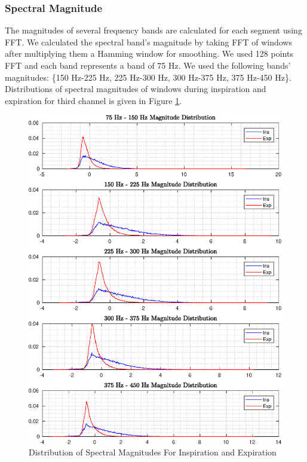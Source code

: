 \subsubsection{Spectral Magnitude}
The magnitudes of several frequency bands are calculated for each segment using FFT. We calculated the spectral band's magnitude by taking FFT of windows after multiplying them a Hamming window for smoothing. We used 128 points FFT and each band represents a band of 75 Hz. We used the following bands' magnitudes: \{150 Hz-225 Hz, 225 Hz-300 Hz, 300 Hz-375 Hz, 375 Hz-450 Hz\}. \\ Distributions of spectral magnitudes of windows during inspiration and expiration for third channel is given in Figure \ref{fig:spectral_ins_exp}. 
\begin{figure}
	\begin{center}
		\includegraphics[width=\textwidth]{figures/spectral_ins_exp.eps}
		\caption{Distribution of Spectral Magnitudes For Inspiration and Expiration}
		\label{fig:spectral_ins_exp}
	\end{center}
\end{figure}
